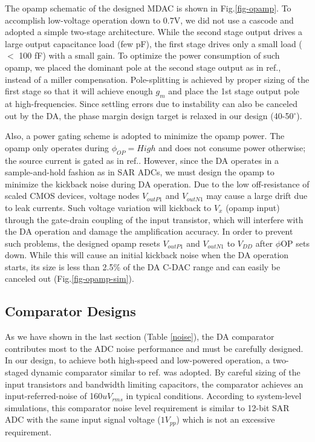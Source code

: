 The opamp schematic of the designed MDAC is shown in Fig.\ref{fig-opamp}. To accomplish low-voltage operation down to 0.7V, we did not use a cascode and adopted a simple two-stage architecture. While the second stage output drives a large output capacitance load (few pF), the first stage drives only a small load ($<$ 100 fF) with a small gain. To optimize the power consumption of such opamp, we  placed the dominant pole at the second stage output as in ref.\cite{hoDSM2015}, instead of a miller compensation. Pole-splitting is achieved by proper sizing of the first stage so that it will achieve enough $g_m$ and place the 1st stage output pole at high-frequencies. Since settling errors due to instability can also be canceled out by the DA, the phase margin design target is relaxed in our design (40-50$^\circ$).

Also, a power gating scheme is adopted to minimize the opamp power. The opamp only operates during $\phi _{OP} = High$ and does not consume power otherwise; the source current is gated as in ref.\cite{chai20125}. However, since the DA operates in a sample-and-hold fashion as in SAR ADCs, we must design the opamp to minimize the kickback noise during DA operation.
Due to the low off-resistance of scaled CMOS devices, voltage nodes $V_{outP1}$ and $V_{outN1}$ may cause a large drift due to leak currents. Such voltage variation will kickback to $V_x$ (opamp input) through the gate-drain coupling of the input transistor, which will interfere with the DA operation and damage the amplification accuracy.
In order to prevent such problems, the designed opamp resets $V_{outP1}$ and $V_{outN1}$ to $V_{DD}$ after 
$\phi$OP sets down. While this will cause an initial kickback noise when the DA operation starts, its size is less than 2.5\% of the DA C-DAC range and can easily be canceled out (Fig.\ref{fig-opamp-sim}).

\subsection{Comparator Designs}
As we have shown in the last section (Table \ref{noise}), the DA comparator contributes most to the ADC noise performance and must be carefully designed. In our design, to achieve both high-speed and low-powered operation, a two-staged dynamic comparator similar to ref.\cite{miyahara2008low} was adopted. By careful sizing of the input transistors and bandwidth limiting capacitors, the comparator achieves an input-referred-noise of 160$uV_{rms}$ in typical conditions. According to system-level simulations, this comparator noise level requirement is similar to 12-bit SAR ADC with the same input signal voltage ($1V_{pp}$) which is not an excessive requirement. 

